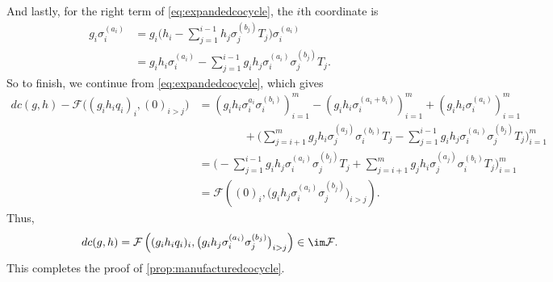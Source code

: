 \documentclass{article}
\numberwithin{equation}{section}
\begin{document}
And lastly, for the right term of \autoref{eq:expandedcocycle}, the $i$th coordinate is
\begin{align*}
	g_i\sigma_i^{(a_i)} &= g_i\Bigg(h_i-\sum_{j=1}^{i-1}h_j\sigma_j^{(b_j)}T_j\Bigg)\sigma_i^{(a_i)} \\
	&= g_ih_i\sigma_i^{(a_i)}-\sum_{j=1}^{i-1}g_ih_j\sigma_i^{(a_i)}\sigma_j^{(b_j)}T_j.
\end{align*}
So to finish, we continue from \autoref{eq:expandedcocycle}, which gives
\begin{align*}
	dc(g,h)-\mathcal F\big((g_ih_iq_i)_i,(0)_{i>j}\big) &= \left(g_ih_i\sigma_i^{a_i}\sigma_i^{(b_i)}\right)_{i=1}^m-\left(g_ih_i\sigma_i^{(a_i+b_i)}\right)_{i=1}^m+\left(g_ih_i\sigma_i^{(a_i)}\right)_{i=1}^m \\
	&\qquad\qquad+\Bigg(\sum_{j=i+1}^{m}g_jh_i\sigma_j^{(a_j)}\sigma_i^{(b_i)}T_j-\sum_{j=1}^{i-1}g_ih_j\sigma_i^{(a_i)}\sigma_j^{(b_j)}T_j\Bigg)_{i=1}^m \\
	&= \Bigg(-\sum_{j=1}^{i-1}g_ih_j\sigma_i^{(a_i)}\sigma_j^{(b_j)}T_j+\sum_{j=i+1}^{m}g_jh_i\sigma_j^{(a_j)}\sigma_i^{(b_i)}T_j\Bigg)_{i=1}^m \\
	&= \mathcal F\left((0)_i,\big(g_ih_j\sigma_i^{(a_i)}\sigma_j^{(b_j)}\big)_{i>j}\right).
\end{align*}
Thus,
\begin{equation}
	dc(g,h) = \mathcal F\left((g_ih_iq_i)_i,\big(g_ih_j\sigma_i^{(a_i)}\sigma_j^{(b_j)}\big)_{i>j}\right)\in\im\mathcal F. \label{eq:computedelta}
\end{equation}
This completes the proof of \autoref{prop:manufacturedcocycle}.
\end{document}
